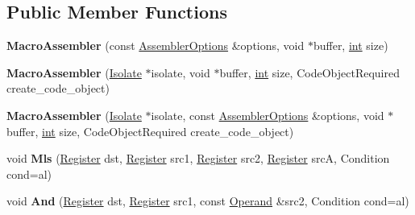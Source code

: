 \subsection*{Public Member Functions}
\begin{DoxyCompactItemize}
\item 
\mbox{\label{classv8_1_1internal_1_1MacroAssembler_ab454c229ecab5061af905b7d5959c919}} 
{\bfseries Macro\+Assembler} (const \mbox{\hyperlink{structv8_1_1internal_1_1AssemblerOptions}{Assembler\+Options}} \&options, void $\ast$buffer, \mbox{\hyperlink{classint}{int}} size)
\item 
\mbox{\label{classv8_1_1internal_1_1MacroAssembler_ace8e2b09ca4bac1b40d12d84416284f9}} 
{\bfseries Macro\+Assembler} (\mbox{\hyperlink{classv8_1_1internal_1_1Isolate}{Isolate}} $\ast$isolate, void $\ast$buffer, \mbox{\hyperlink{classint}{int}} size, Code\+Object\+Required create\+\_\+code\+\_\+object)
\item 
\mbox{\label{classv8_1_1internal_1_1MacroAssembler_a118ab3d38490e9a50ee0157274ac3dc9}} 
{\bfseries Macro\+Assembler} (\mbox{\hyperlink{classv8_1_1internal_1_1Isolate}{Isolate}} $\ast$isolate, const \mbox{\hyperlink{structv8_1_1internal_1_1AssemblerOptions}{Assembler\+Options}} \&options, void $\ast$buffer, \mbox{\hyperlink{classint}{int}} size, Code\+Object\+Required create\+\_\+code\+\_\+object)
\item 
\mbox{\label{classv8_1_1internal_1_1MacroAssembler_ad3735e5b27f420dd933fe69e378d041f}} 
void {\bfseries Mls} (\mbox{\hyperlink{classv8_1_1internal_1_1Register}{Register}} dst, \mbox{\hyperlink{classv8_1_1internal_1_1Register}{Register}} src1, \mbox{\hyperlink{classv8_1_1internal_1_1Register}{Register}} src2, \mbox{\hyperlink{classv8_1_1internal_1_1Register}{Register}} srcA, Condition cond=al)
\item 
\mbox{\label{classv8_1_1internal_1_1MacroAssembler_a818574e0afe29c2a7fd81452a578cc3a}} 
void {\bfseries And} (\mbox{\hyperlink{classv8_1_1internal_1_1Register}{Register}} dst, \mbox{\hyperlink{classv8_1_1internal_1_1Register}{Register}} src1, const \mbox{\hyperlink{classv8_1_1internal_1_1Operand}{Operand}} \&src2, Condition cond=al)

\end{DoxyCompactItemize}
